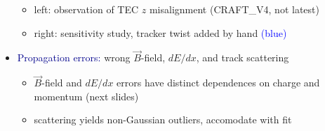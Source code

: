 \documentclass[compress]{beamer}
\begin{document}
\begin{frame}
\begin{itemize}
\begin{itemize}
\vspace{0.3 cm}
\item left: observation of TEC $z$ misalignment {\scriptsize (CRAFT\_V4, not latest)}
\item right: sensitivity study, tracker twist added by hand \textcolor{blue}{(blue)}
\end{itemize}

\item \textcolor{darkblue}{Propagation errors:} wrong $\vec{B}$-field, $dE/dx$, and track scattering
\begin{itemize}\setlength{\itemsep}{0.1 cm}
\item $\vec{B}$-field and $dE/dx$ errors have distinct dependences on charge and momentum (next slides)
\item scattering yields non-Gaussian outliers, accomodate with fit
\end{itemize}
\end{itemize}
\end{frame}
\end{document}
